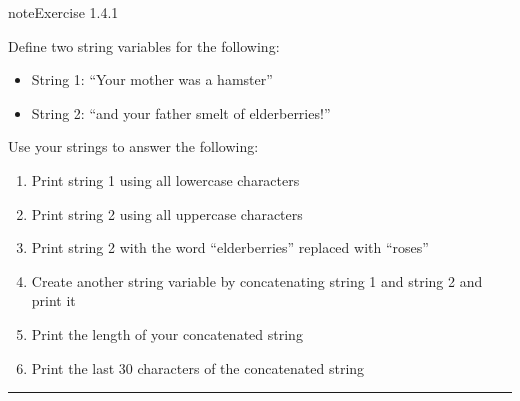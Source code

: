 \documentclass[letterpaper,10pt,english]{jupyterBook}
\begin{document}
\begin{sphinxadmonition}{note}{Exercise 1.4.1}



\sphinxAtStartPar
Define two string variables for the following:
\begin{itemize}
\item {} 
\sphinxAtStartPar
String 1: “Your mother was a hamster”

\item {} 
\sphinxAtStartPar
String 2: “and your father smelt of elderberries!”

\end{itemize}

\sphinxAtStartPar
Use your strings to answer the following:
\begin{enumerate}
%
\item {} 
\sphinxAtStartPar
Print string 1 using all lowercase characters

\item {} 
\sphinxAtStartPar
Print string 2 using all uppercase characters

\item {} 
\sphinxAtStartPar
Print string 2 with the word “elderberries” replaced with “roses”

\item {} 
\sphinxAtStartPar
Create another string variable by concatenating string 1 and string 2 and print it

\item {} 
\sphinxAtStartPar
Print the length of your concatenated string

\item {} 
\sphinxAtStartPar
Print the last 30 characters of the concatenated string

\end{enumerate}
\end{sphinxadmonition}


\bigskip\hrule\bigskip








\renewcommand{\indexname}{Index}
\printindex
\end{document}
